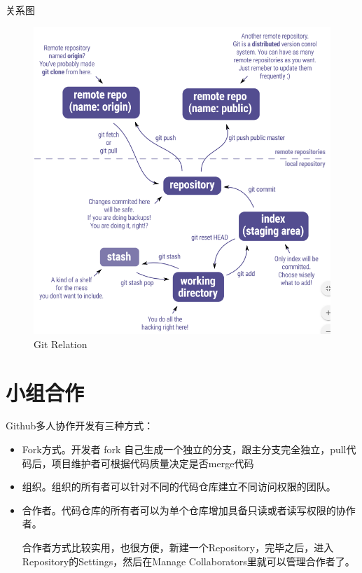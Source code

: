 \documentclass[hyperref,UTF8,10pt]{beamer}
\numberwithin{equation}{section} %
\begin{document}
\begin{frame}{关系图}
\begin{figure}
\centering
\includegraphics[height=\textheight]{rela.PNG}
\caption{Git Relation}
\end{figure}
\end{frame}

\section{小组合作}
\begin{frame}

Github多人协作开发有三种方式：
\begin{itemize}
\item Fork方式。开发者 fork 自己生成一个独立的分支，跟主分支完全独立，pull代码后，项目维护者可根据代码质量决定是否merge代码
\item 组织。组织的所有者可以针对不同的代码仓库建立不同访问权限的团队。
\item 合作者。代码仓库的所有者可以为单个仓库增加具备只读或者读写权限的协作者。

合作者方式比较实用，也很方便，新建一个Repository，完毕之后，进入Repository的Settings，然后在Manage Collaborators里就可以管理合作者了。
\end{itemize}
\end{frame}
\end{document}
